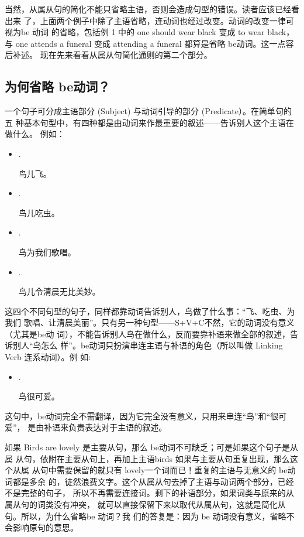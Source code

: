 当然，从属从句的简化不能只省略主语，否则会造成句型的错误。读者应该已经看出来
了，上面两个例子中除了主语省略，连动词也经过改变。动词的改变一律可视为be 动词
的省略，包括例 1 中的 one should wear black 变成 to wear black，与 one
attends a funeral 变成 attending a funeral 都算是省略 be动词。这一点容后补述。
现在先来看看从属从句简化通则的第二个部分。

\subsection{为何省略 be动词？}

一个句子可分成主语部分 (Subject) 与动词引导的部分 (Predicate）。在简单句的五
种基本句型中，有四种都是由动词来作最重要的叙述——告诉别人这个主语在做什么。
例如：

\begin{itemize}
\item {} .

  鸟儿飞。
\item {}  .

  鸟儿吃虫。
\item {}   .

  鸟为我们歌唱。
\item {}   .

  鸟儿令清晨无比美妙。
\end{itemize}
这四个不同句型的句子，同样都靠动词告诉别人，鸟做了什么事：“飞、吃虫、为我们
歌唱、让清晨美丽”。只有另一种句型——S+V+C不然，它的动词没有意义（尤其是be动
词），不能告诉别人鸟在做什么，反而要靠补语来做全部的叙述，告诉别人“鸟怎么
样”。be动词只扮演串连主语与补语的角色（所以叫做 Linking Verb 连系动词）。例
如:
\begin{itemize}
\item {}  .

  鸟很可爱。
\end{itemize}
这句中，be动词完全不需翻译，因为它完全没有意义，只用来串连“鸟”和“很可爱”，
是由补语来负责表达对于主语的叙述。

如果 Birds are lovely 是主要从句，那么 be动词不可缺乏；可是如果这个句子是从属
从句，依附在主要从句上，再加上主语birds 如果与主要从句重复出现，那么这个从属
从句中需要保留的就只有 lovely一个词而已！重复的主语与无意义的 be动词都是多余
的，徒然浪费文字。这个从属从句去掉了主语与动词两个部分，已经不是完整的句子，
所以不再需要连接词。剩下的补语部分，如果词类与原来的从属从句的词类没有冲突，
就可以直接保留下来以取代从属从句，这就是简化从句。所以，为什么省略be 动词？我
们的答复是：因为 be 动词没有意义，省略不会影响原句的意思。


